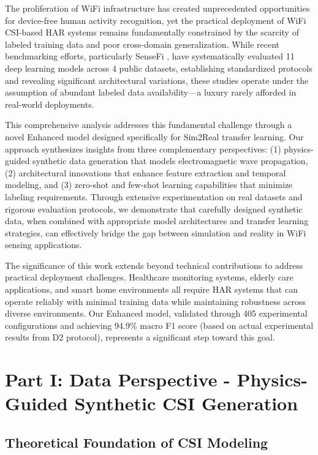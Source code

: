\documentclass[journal]{IEEEtran}
\begin{document}
The proliferation of WiFi infrastructure has created unprecedented opportunities for device-free human activity recognition, yet the practical deployment of WiFi CSI-based HAR systems remains fundamentally constrained by the scarcity of labeled training data and poor cross-domain generalization. While recent benchmarking efforts, particularly SenseFi \cite{yang2023sensefi}, have systematically evaluated 11 deep learning models across 4 public datasets, establishing standardized protocols and revealing significant architectural variations, these studies operate under the assumption of abundant labeled data availability---a luxury rarely afforded in real-world deployments.

This comprehensive analysis addresses this fundamental challenge through a novel Enhanced model designed specifically for Sim2Real transfer learning. Our approach synthesizes insights from three complementary perspectives: (1) physics-guided synthetic data generation that models electromagnetic wave propagation, (2) architectural innovations that enhance feature extraction and temporal modeling, and (3) zero-shot and few-shot learning capabilities that minimize labeling requirements. Through extensive experimentation on real datasets and rigorous evaluation protocols, we demonstrate that carefully designed synthetic data, when combined with appropriate model architectures and transfer learning strategies, can effectively bridge the gap between simulation and reality in WiFi sensing applications.

The significance of this work extends beyond technical contributions to address practical deployment challenges. Healthcare monitoring systems, elderly care applications, and smart home environments all require HAR systems that can operate reliably with minimal training data while maintaining robustness across diverse environments. Our Enhanced model, validated through 405 experimental configurations and achieving 94.9\% macro F1 score (based on actual experimental results from D2 protocol), represents a significant step toward this goal.

\section{Part I: Data Perspective - Physics-Guided Synthetic CSI Generation}

\subsection{Theoretical Foundation of CSI Modeling}
\end{document}
